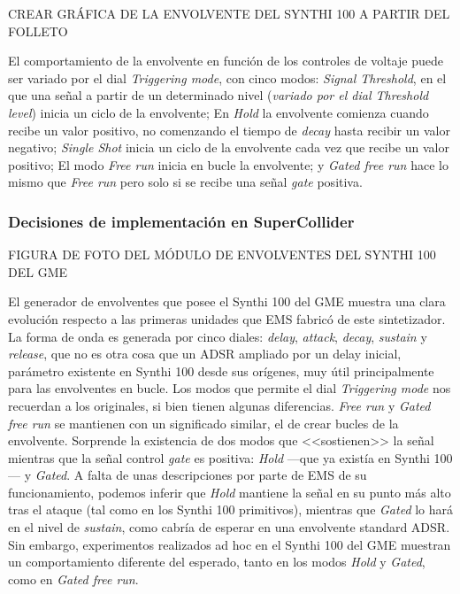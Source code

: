 CREAR GRÁFICA DE LA ENVOLVENTE DEL SYNTHI 100 A PARTIR DEL FOLLETO

El comportamiento de la envolvente en función de los controles de voltaje puede ser variado por el dial \textit{Triggering mode}, con cinco modos: \textit{Signal Threshold}, en el que una señal a partir de un determinado nivel (\textit{variado por el dial \textit{Threshold level}}) inicia un ciclo de la envolvente; En \textit{Hold} la envolvente comienza cuando recibe un valor positivo, no comenzando el tiempo de \textit{decay} hasta recibir un valor negativo;  \textit{Single Shot} inicia un ciclo de la envolvente cada vez que recibe un valor positivo; El modo \textit{Free run} inicia en bucle la envolvente; y \textit{Gated free run} hace lo mismo que \textit{Free run} pero solo si se recibe una señal \textit{gate} positiva.

\subsubsection{Decisiones de implementación en SuperCollider}


FIGURA DE FOTO DEL MÓDULO DE ENVOLVENTES DEL SYNTHI 100 DEL GME

El generador de envolventes que posee el Synthi 100 del GME muestra una clara evolución respecto a las primeras unidades que EMS fabricó de este sintetizador. La forma de onda es generada por cinco diales: \textit{delay}, \textit{attack}, \textit{decay}, \textit{sustain} y \textit{release}, que no es otra cosa que un ADSR ampliado por un delay inicial, parámetro existente en Synthi 100 desde sus orígenes, muy útil principalmente para las envolventes en bucle. Los modos que permite el dial \textit{Triggering mode} nos recuerdan a los originales, si bien tienen algunas diferencias. \textit{Free run} y \textit{Gated free run} se mantienen con un significado similar, el de crear bucles de la envolvente. Sorprende la existencia de dos modos que <<sostienen>> la señal mientras que la señal control \textit{gate} es positiva: \textit{Hold} ---que ya existía en Synthi 100--- y \textit{Gated}. A falta de unas descripciones por parte de EMS de su funcionamiento, podemos inferir que \textit{Hold} mantiene la señal en su punto más alto tras el ataque (tal como en los Synthi 100 primitivos), mientras que \textit{Gated} lo hará en el nivel de \textit{sustain}, como cabría de esperar en una envolvente standard ADSR. Sin embargo, experimentos realizados ad hoc en el Synthi 100 del GME muestran un comportamiento diferente del esperado, tanto en los modos \textit{Hold} y \textit{Gated}, como en \textit{Gated free run}.

